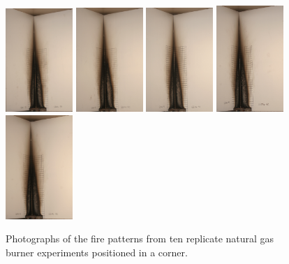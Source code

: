 \documentclass[twoside]{uocthesis}
\begin{document}
{\begin{figure}[p]
	\includegraphics[width=1.0in]{../Figures/GBNG39_IMG_9222}
	\includegraphics[width=1.0in]{../Figures/GBNG40_IMG_9235}
	\includegraphics[width=1.0in]{../Figures/GBNG41_IMG_9249}
	\includegraphics[width=1.0in]{../Figures/GBNG42_IMG_9262}
	\includegraphics[width=1.0in]{../Figures/GBNG43_IMG_9275} \\

	\caption[Photographs of the fire patterns from ten replicate natural gas burner experiments positioned in a corner]{Photographs of the fire patterns from ten replicate natural gas burner experiments positioned in a corner.}
	\label{NG_Corner}
\end{figure}

}
\end{document}
